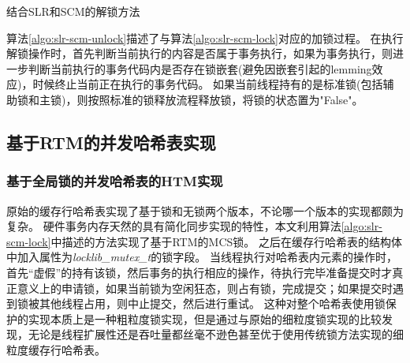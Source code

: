 \begin{algorithm}[htbp]
\SetAlgoLined
{}
\caption{结合SLR和SCM的解锁方法}
\label{algo:slr-scm-unlock}
\end{algorithm}

算法\ref{algo:slr-scm-unlock}描述了与算法\ref{algo:slr-scm-lock}对应的加锁过程。
在执行解锁操作时，首先判断当前执行的内容是否属于事务执行，如果为事务执行，则进一步判断当前执行的事务代码内是否存在锁嵌套(避免因嵌套引起的lemming效应)，时候终止当前正在执行的事务代码。
如果当前线程持有的是标准锁(包括辅助锁和主锁)，则按照标准的锁释放流程释放锁，将锁的状态置为"False"。

\subsection{基于RTM的并发哈希表实现}

\subsubsection{基于全局锁的并发哈希表的HTM实现}

原始的缓存行哈希表实现了基于锁和无锁两个版本，不论哪一个版本的实现都颇为复杂。
硬件事务内存天然的具有简化同步实现的特性，本文利用算法\ref{algo:slr-scm-lock}中描述的方法实现了基于RTM的MCS锁。
之后在缓存行哈希表的结构体中加入属性为\textit{locklib\_mutex\_t}的锁字段。
当线程执行对哈希表内元素的操作时，首先“虚假”的持有该锁，然后事务的执行相应的操作，待执行完毕准备提交时才真正意义上的申请锁，如果当前锁为空闲狂态，则占有锁，完成提交；如果提交时遇到锁被其他线程占用，则中止提交，然后进行重试。
这种对整个哈希表使用锁保护的实现本质上是一种粗粒度锁实现，但是通过与原始的细粒度锁实现的比较发现，无论是线程扩展性还是吞吐量都丝毫不逊色甚至优于使用传统锁方法实现的细粒度缓存行哈希表。

